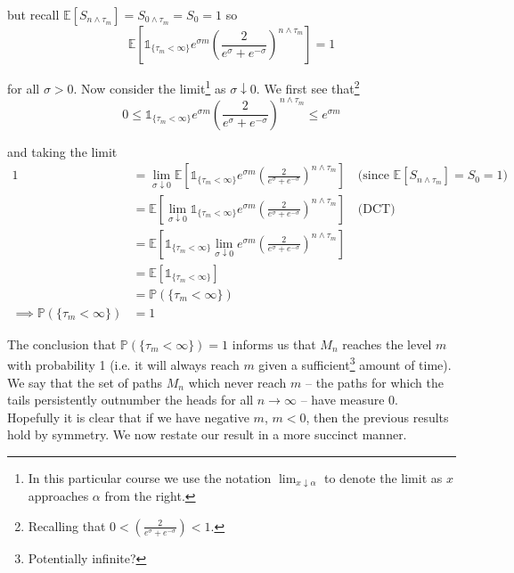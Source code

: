 \documentclass[12pt]{article}
\newlength\tindent
\renewcommand{\indent}{\hspace*{\tindent}}
\renewcommand{\P}{\mathbb P}
\newcommand{\E}{\mathbb E}
\begin{document}
but recall $\E[S_{n\land\tau_m}] = S_{0\land\tau_m} = S_0 = 1$ so
\begin{equation*}
	\E \left[ \mathds 1_{\{\tau_m < \infty\}} e^{\sigma m} \left( \frac{2}{e^\sigma + e^{-\sigma} } \right)^{n\land\tau_m} \right] = 1
\end{equation*}

for all $\sigma > 0$. Now consider the limit\footnote{In this particular course we use the notation $\lim_{x\downarrow \alpha}$ to denote the limit as $x$ approaches $\alpha$ from the right.} as $\sigma \downarrow 0$. We first see that\footnote{Recalling that $0 < \left( \frac{2}{e^\sigma + e^{-\sigma} } \right) < 1$.}
\begin{equation*}
	0 \leq \mathds 1_{\{\tau_m < \infty\}} e^{\sigma m} \left( \frac{2}{e^\sigma + e^{-\sigma} } \right)^{n\land\tau_m} \leq e^{\sigma m}
\end{equation*}

and taking the limit
\begin{align*}
	1 &= \lim_{\sigma\downarrow 0} \E \left[ \mathds 1_{\{\tau_m < \infty\}} e^{\sigma m} \left( \frac{2}{e^\sigma + e^{-\sigma} } \right)^{n\land\tau_m} \right] \quad \text{(since $\E[S_{n\land\tau_m}] = S_0 = 1$)} \\	
	&= \E \left[ \lim_{\sigma\downarrow 0} \mathds 1_{\{\tau_m < \infty\}} e^{\sigma m} \left( \frac{2}{e^\sigma + e^{-\sigma} } \right)^{n\land\tau_m} \right] \quad \text{(DCT)} \\
	&= \E \left[ \mathds 1_{\{\tau_m < \infty\}} \lim_{\sigma\downarrow 0} e^{\sigma m} \left( \frac{2}{e^\sigma + e^{-\sigma} } \right)^{n\land\tau_m} \right] \\
	&= \E \left[ \mathds 1_{\{\tau_m < \infty\}} \right] \\
	&= \P( \{ \tau_m < \infty \} ) \\
	\implies \P( \{ \tau_m < \infty \} ) &= 1
\end{align*}

\indent The conclusion that $\P( \{ \tau_m < \infty \} ) = 1$ informs us that $M_n$ reaches the level $m$ with probability 1 (i.e. it will always reach $m$ given a sufficient\footnote{Potentially infinite?} amount of time). We say that the set of paths $M_n$ which never reach $m$ -- the paths for which the tails persistently outnumber the heads for all $n \to \infty$ -- have measure 0. \\

\indent Hopefully it is clear that if we have negative $m$, $m < 0$, then the previous results hold by symmetry. We now restate our result in a more succinct manner.
\end{document}
